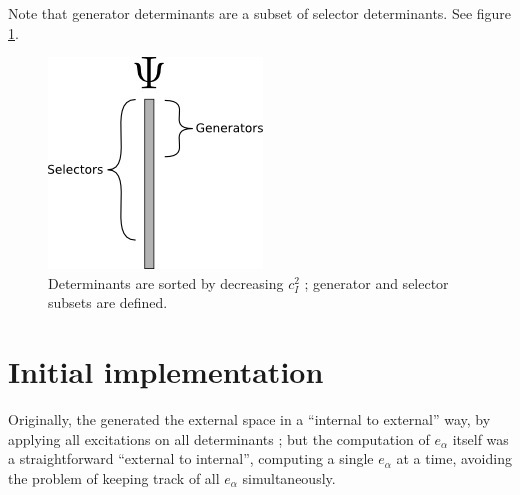 \documentclass[./thesis.tex]{subfiles}
\begin{document}
Note that generator determinants are a subset of selector determinants. See figure \ref{fig:generators_selectors}.


\begin{figure}[h!]
        
        \begin{center}
                \includegraphics[width=0.25\columnwidth]{figures/cipsi/selexemple2}
        \end{center}
        \caption{Determinants are sorted by decreasing $c_I^2$ ; generator and selector subsets are defined.}
        \label{fig:generators_selectors}
\end{figure}



\section{Initial implementation}

Originally, the \QP generated the external space in a ``internal to external'' way, by applying all excitations on all determinants ; but the computation of $e_\alpha$ itself was a straightforward ``external to internal'', computing a single $e_\alpha$ at a time, avoiding the problem of keeping track of all $e_\alpha$ simultaneously.
\end{document}

